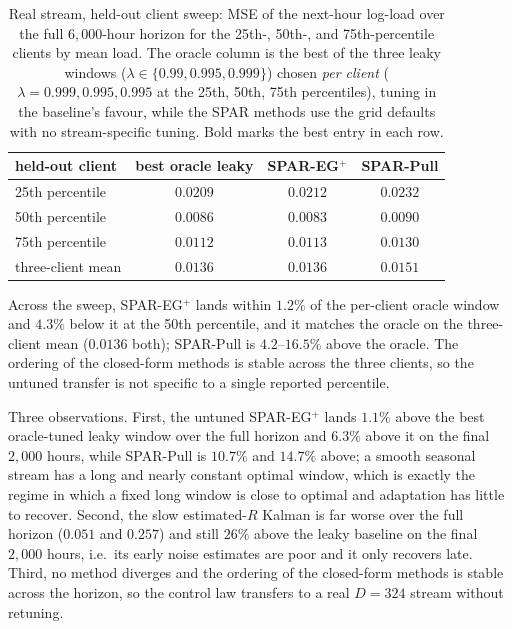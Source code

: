 \documentclass[11pt]{article}
\begin{document}
\begin{table}[!htbp]
\centering
\footnotesize
\setlength{\tabcolsep}{5pt}
\caption{Real stream, held-out client sweep: MSE of the next-hour log-load over the full $6{,}000$-hour horizon for the 25th-, 50th-, and 75th-percentile clients by mean load.
The oracle column is the best of the three leaky windows ($\lambda \in \{0.99, 0.995, 0.999\}$) chosen \emph{per client} ($\lambda = 0.999, 0.995, 0.995$ at the 25th, 50th, 75th percentiles), tuning in the baseline's favour, while the SPAR methods use the grid defaults with no stream-specific tuning.
Bold marks the best entry in each row.}
\label{tab:electricity-clients}
\begin{tabular}{lccc}
\toprule
held-out client & best oracle leaky & SPAR-EG$^+$ & SPAR-Pull \\
\midrule
25th percentile & $\mathbf{0.0209}$ & $0.0212$ & $0.0232$ \\
50th percentile & $0.0086$ & $\mathbf{0.0083}$ & $0.0090$ \\
75th percentile & $\mathbf{0.0112}$ & $0.0113$ & $0.0130$ \\
\midrule
three-client mean & $\mathbf{0.0136}$ & $\mathbf{0.0136}$ & $0.0151$ \\
\bottomrule
\end{tabular}
\end{table}

Across the sweep, SPAR-EG$^+$ lands within $1.2\%$ of the per-client oracle window and $4.3\%$ below it at the 50th percentile, and it matches the oracle on the three-client mean ($0.0136$ both); SPAR-Pull is $4.2$--$16.5\%$ above the oracle.
The ordering of the closed-form methods is stable across the three clients, so the untuned transfer is not specific to a single reported percentile.

Three observations.
First, the untuned SPAR-EG$^+$ lands $1.1\%$ above the best oracle-tuned leaky window over the full horizon and $6.3\%$ above it on the final $2{,}000$ hours, while SPAR-Pull is $10.7\%$ and $14.7\%$ above; a smooth seasonal stream has a long and nearly constant optimal window, which is exactly the regime in which a fixed long window is close to optimal and adaptation has little to recover.
Second, the slow estimated-$R$ Kalman is far worse over the full horizon ($0.051$ and $0.257$) and still $26\%$ above the leaky baseline on the final $2{,}000$ hours, i.e.\ its early noise estimates are poor and it only recovers late.
Third, no method diverges and the ordering of the closed-form methods is stable across the horizon, so the control law transfers to a real $D = 324$ stream without retuning.
\end{document}
